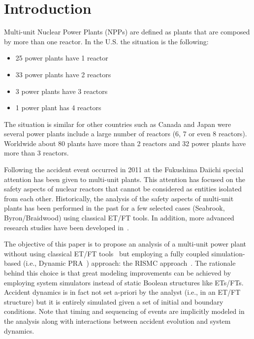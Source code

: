 \section{Introduction}
\label{sec:introduction}

Multi-unit Nuclear Power Plants (NPPs) are defined as plants that are composed by more than one reactor. 
In the U.S. the situation is the following:
\begin{itemize}
  \item 25 power plants have 1 reactor
  \item 33 power plants have 2 reactors
  \item 3 power plants have 3 reactors
  \item 1 power plant has 4 reactors
\end{itemize}
The situation is similar for other countries such as Canada and Japan were 
several power plants include a large number of reactors (6, 7 or even 8 reactors). 
Worldwide about 80 plants have more than 2 reactors and 32 power plants have more than 3 reactors. 

Following the accident event occurred in 2011 at the Fukushima Daiichi special 
attention has been given to multi-unit plants. This attention has focused on the 
safety aspects of nuclear reactors that cannot be considered as entities isolated from each other. 
Historically, the analysis of the safety aspects of multi-unit plants has been performed 
in the past for a few selected cases (Seabrook, Byron/Braidwood) using classical ET/FT tools. 
In addition, more advanced research studies have been developed in~\cite{}. 

The objective of this paper is to propose an analysis of a multi-unit power plant without 
using classical ET/FT tools~\cite{Nureg1150} but employing a fully coupled simulation-based 
(i.e., Dynamic PRA~\cite{DynamicReliabilityMonteCarlo}) approach: 
the RISMC approach~\cite{RISMC,mandelliNewAlgo}. 
The rationale behind this choice is that great modeling improvements can be achieved by 
employing system simulators instead of static Boolean structures like ETs/FTs. 
Accident dynamics is in fact not set a-priori by the analyst (i.e., in an ET/FT structure) 
but it is entirely simulated given a set of initial and boundary conditions. Note that timing and 
sequencing of events are implicitly modeled in the analysis along with interactions between 
accident evolution and system dynamics.
